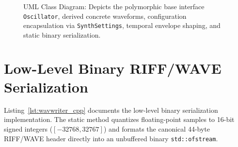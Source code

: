 \documentclass[12pt,a4paper,oneside]{book}
\begin{document}
\begin{figure}[htbp]
{
}
\caption{UML Class Diagram: Depicts the polymorphic base interface \texttt{Oscillator}, derived concrete waveforms, configuration encapsulation via \texttt{SynthSettings}, temporal envelope shaping, and static binary serialization.}
\label{fig:uml_class}
\end{figure}

\FloatBarrier
    
\section{Low-Level Binary RIFF/WAVE Serialization}
Listing~\ref{lst:wavwriter_cpp} documents the low-level binary serialization implementation. The static method quantizes floating-point samples to 16-bit signed integers ($[-32768, 32767]$) and formats the canonical 44-byte RIFF/WAVE header directly into an unbuffered binary \texttt{std::ofstream}.
\end{document}
